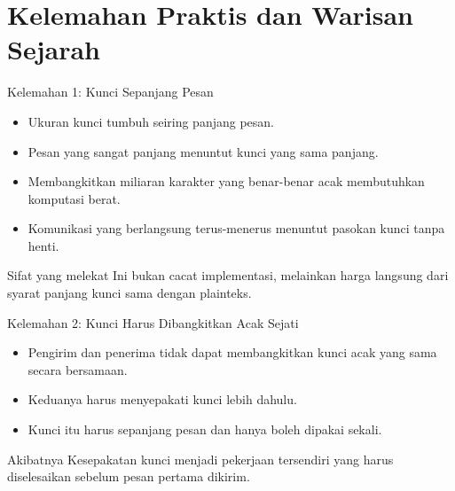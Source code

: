 \documentclass[aspectratio=169,11pt]{beamer}
\begin{document}
\section{Kelemahan Praktis dan Warisan Sejarah}

\begin{frame}{Kelemahan 1: Kunci Sepanjang Pesan}
    \footnotesize
    \begin{itemize}
        \item Ukuran kunci tumbuh seiring panjang pesan.
        \item Pesan yang sangat panjang menuntut kunci yang sama panjang.
        \item Membangkitkan miliaran karakter yang benar-benar acak
              membutuhkan komputasi berat.
        \item Komunikasi yang berlangsung terus-menerus menuntut pasokan
              kunci tanpa henti.
    \end{itemize}
    \vspace{0.2cm}
    \begin{alertblock}{Sifat yang melekat}
        Ini bukan cacat implementasi, melainkan harga langsung dari syarat
        panjang kunci sama dengan plainteks.
    \end{alertblock}
\end{frame}

\begin{frame}{Kelemahan 2: Kunci Harus Dibangkitkan Acak Sejati}
    \footnotesize
    \begin{itemize}
        \item Pengirim dan penerima tidak dapat membangkitkan kunci acak
              yang sama secara bersamaan.
        \item Keduanya harus menyepakati kunci lebih dahulu.
        \item Kunci itu harus sepanjang pesan dan hanya boleh dipakai
              sekali.
    \end{itemize}
    \vspace{0.2cm}
    \begin{exampleblock}{Akibatnya}
        Kesepakatan kunci menjadi pekerjaan tersendiri yang harus
        diselesaikan sebelum pesan pertama dikirim.
    \end{exampleblock}
\end{frame}
\end{document}
